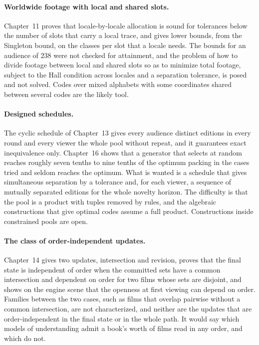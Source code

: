 \documentclass[11pt,twoside,openright]{book}
\theoremstyle{plain}
\theoremstyle{definition}
\theoremstyle{remark}
\begin{document}
\paragraph{Worldwide footage with local and shared slots.} Chapter~11 proves that locale-by-locale allocation is sound for tolerances below the number of slots that carry a local trace, and gives lower bounds, from the Singleton bound, on the classes per slot that a locale needs. The bounds for an audience of $238$ were not checked for attainment, and the problem of how to divide footage between local and shared slots so as to minimize total footage, subject to the Hall condition across locales and a separation tolerance, is posed and not solved. Codes over mixed alphabets with some coordinates shared between several codes are the likely tool.

\paragraph{Designed schedules.} The cyclic schedule of Chapter~13 gives every audience distinct editions in every round and every viewer the whole pool without repeat, and it guarantees exact inequivalence only. Chapter~16 shows that a generator that selects at random reaches roughly seven tenths to nine tenths of the optimum packing in the cases tried and seldom reaches the optimum. What is wanted is a schedule that gives simultaneous separation by a tolerance and, for each viewer, a sequence of mutually separated editions for the whole novelty horizon. The difficulty is that the pool is a product with tuples removed by rules, and the algebraic constructions that give optimal codes assume a full product. Constructions inside constrained pools are open.

\paragraph{The class of order-independent updates.} Chapter~14 gives two updates, intersection and revision, proves that the final state is independent of order when the committed sets have a common intersection and dependent on order for two films whose sets are disjoint, and shows on the engine scene that the openness at first viewing can depend on order. Families between the two cases, such as films that overlap pairwise without a common intersection, are not characterized, and neither are the updates that are order-independent in the final state or in the whole path. It would say which models of understanding admit a book's worth of films read in any order, and which do not.
\end{document}
